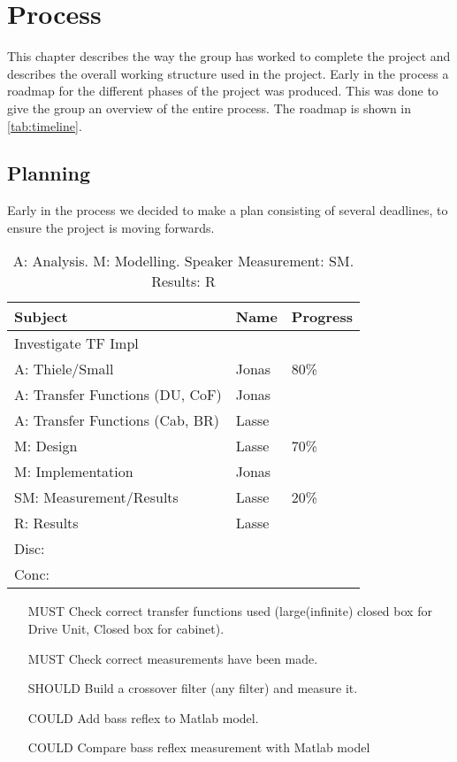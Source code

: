 
\chapter{Process}
This chapter describes the way the group has worked to complete the project and describes the overall working structure used in the project.
Early in the process a roadmap for the different phases of the project was produced. This was done to give the group an overview of the entire process. The roadmap is shown in \cref{tab:timeline}.

\section{Planning}
Early in the process we decided to make a plan consisting of several deadlines, to ensure the project is moving forwards.

\begin{table}
	\begin{tabularx}{\textwidth}{l X X}
		\toprule
		\textbf{Subject} & \textbf{Name} & \textbf{Progress} \\
		\midrule
		Investigate TF Impl & & \\
		A: Thiele/Small & Jonas & 80\% \\
		A: Transfer Functions (DU, CoF) & Jonas & \\
		A: Transfer Functions (Cab, BR) & Lasse & \\
		M: Design & Lasse & 70\% \\
		M: Implementation & Jonas & \\
		SM: Measurement/Results & Lasse & 20\% \\
		R: Results & Lasse & \\
		Disc: & & \\
		Conc: & & \\
		\bottomrule
	\end{tabularx}
	\caption{A: Analysis. M: Modelling. Speaker Measurement: SM. Results: R}
\end{table}

\begin{itemize}
	\item[MUST] Check correct transfer functions used (large(infinite) closed box for Drive Unit, Closed box for cabinet).
	\item[MUST] Check correct measurements have been made.
	\item[SHOULD] Build a crossover filter (any filter) and measure it.
	\item[COULD] Add bass reflex to Matlab model.
	\item[COULD] Compare bass reflex measurement with Matlab model
\end{itemize}
